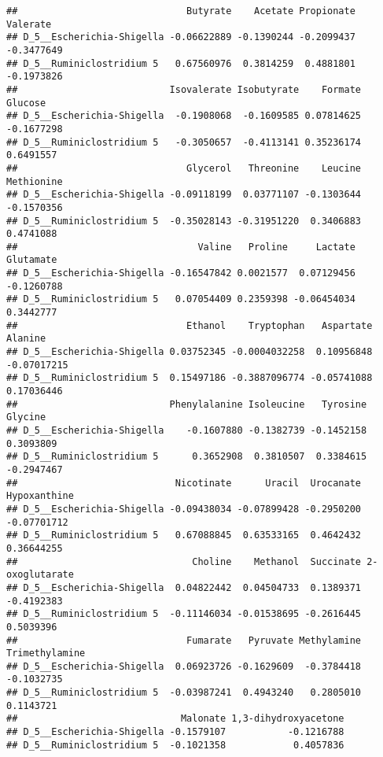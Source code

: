 \documentclass[
  oneside]{book}
\newenvironment{Shaded}{\begin{snugshade}}{\end{snugshade}}
\newcommand{\FunctionTok}[1]{\textcolor[rgb]{0.00,0.00,0.00}{#1}}
\newcommand{\NormalTok}[1]{#1}
\newcommand{\SpecialCharTok}[1]{\textcolor[rgb]{0.00,0.00,0.00}{#1}}
\begin{document}
\begin{verbatim}
##                              Butyrate    Acetate Propionate   Valerate
## D_5__Escherichia-Shigella -0.06622889 -0.1390244 -0.2099437 -0.3477649
## D_5__Ruminiclostridium 5   0.67560976  0.3814259  0.4881801 -0.1973826
##                           Isovalerate Isobutyrate    Formate    Glucose
## D_5__Escherichia-Shigella  -0.1908068  -0.1609585 0.07814625 -0.1677298
## D_5__Ruminiclostridium 5   -0.3050657  -0.4113141 0.35236174  0.6491557
##                              Glycerol   Threonine    Leucine Methionine
## D_5__Escherichia-Shigella -0.09118199  0.03771107 -0.1303644 -0.1570356
## D_5__Ruminiclostridium 5  -0.35028143 -0.31951220  0.3406883  0.4741088
##                                Valine   Proline     Lactate  Glutamate
## D_5__Escherichia-Shigella -0.16547842 0.0021577  0.07129456 -0.1260788
## D_5__Ruminiclostridium 5   0.07054409 0.2359398 -0.06454034  0.3442777
##                              Ethanol    Tryptophan   Aspartate     Alanine
## D_5__Escherichia-Shigella 0.03752345 -0.0004032258  0.10956848 -0.07017215
## D_5__Ruminiclostridium 5  0.15497186 -0.3887096774 -0.05741088  0.17036446
##                           Phenylalanine Isoleucine   Tyrosine    Glycine
## D_5__Escherichia-Shigella    -0.1607880 -0.1382739 -0.1452158  0.3093809
## D_5__Ruminiclostridium 5      0.3652908  0.3810507  0.3384615 -0.2947467
##                            Nicotinate      Uracil  Urocanate Hypoxanthine
## D_5__Escherichia-Shigella -0.09438034 -0.07899428 -0.2950200  -0.07701712
## D_5__Ruminiclostridium 5   0.67088845  0.63533165  0.4642432   0.36644255
##                               Choline    Methanol  Succinate 2-oxoglutarate
## D_5__Escherichia-Shigella  0.04822442  0.04504733  0.1389371     -0.4192383
## D_5__Ruminiclostridium 5  -0.11146034 -0.01538695 -0.2616445      0.5039396
##                              Fumarate   Pyruvate Methylamine Trimethylamine
## D_5__Escherichia-Shigella  0.06923726 -0.1629609  -0.3784418     -0.1032735
## D_5__Ruminiclostridium 5  -0.03987241  0.4943240   0.2805010      0.1143721
##                             Malonate 1,3-dihydroxyacetone
## D_5__Escherichia-Shigella -0.1579107           -0.1216788
## D_5__Ruminiclostridium 5  -0.1021358            0.4057836
\end{verbatim}

\begin{Shaded}
\end{Shaded}
\end{document}

